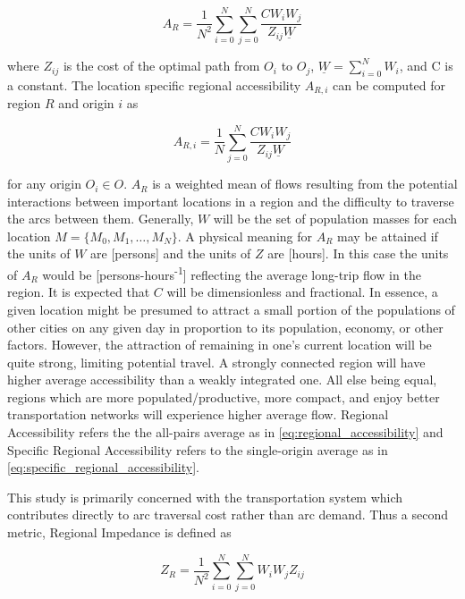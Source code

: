 \documentclass[11pt]{article}
\begin{document}
\begin{multicols}{2}
\begin{equation}
	A_{R} = \frac{1}{N^2}\sum_{i = 0}^{N} \sum_{j = 0 }^{N} \frac{CW_iW_j}{Z_{ij}\underline{W}} \label{eq:regional_accessibility}
\end{equation}

\noindent where $Z_{ij}$ is the cost of the optimal path from $O_i$ to $O_j$, $\underline{W} = \sum_{i = 0}^{N} W_i$, and C is a constant. The location specific regional accessibility $A_{R,i}$ can be computed for region $R$ and origin $i$ as

\begin{equation}
	A_{R,i} = \frac{1}{N}\sum_{j = 0 }^{N} \frac{CW_iW_j}{Z_{ij}\underline{W}} \label{eq:specific_regional_accessibility}
\end{equation}

for any origin $O_i \in O$. $A_{R}$ is a weighted mean of flows resulting from the potential interactions between important locations in a region and the difficulty to traverse the arcs between them. Generally, $W$ will be the set of population masses for each location $M = \{M_0, M_1, \dots, M_N\}$. A physical meaning for $A_R$ may be attained if the units of $W$ are [persons] and the units of $Z$ are [hours]. In this case the units of $A_R$ would be [persons-hours\textsuperscript{-1}] reflecting the average long-trip flow in the region. It is expected that $C$ will be dimensionless and fractional. In essence, a given location might be presumed to attract a small portion of the populations of other cities on any given day in proportion to its population, economy, or other factors. However, the attraction of remaining in one's current location will be quite strong, limiting potential travel. A strongly connected region will have higher average accessibility than a weakly integrated one. All else being equal, regions which are more populated/productive, more compact, and enjoy better transportation networks will experience higher average flow. Regional Accessibility refers the the all-pairs average as in \eqref{eq:regional_accessibility} and Specific Regional Accessibility refers to the single-origin average as in \eqref{eq:specific_regional_accessibility}.

This study is primarily concerned with the transportation system which contributes directly to arc traversal cost rather than arc demand. Thus a second metric, Regional Impedance is defined as

\begin{equation}
	Z_{R} = \frac{1}{N^2}\sum_{i = 0}^{N} \sum_{j = 0 }^{N} W_iW_jZ_{ij} \label{eq:regional_impedance}
\end{equation}


\end{multicols}
\end{document}
